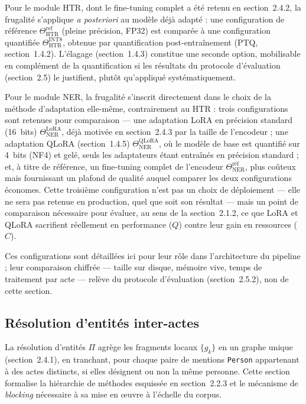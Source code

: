 Pour le module HTR, dont le fine-tuning complet a été retenu en section~2.4.2, la frugalité s'applique \emph{a posteriori} au modèle déjà adapté : une configuration de référence $\Theta_{\mathrm{HTR}}^{\mathrm{ref}}$ (pleine précision, FP32) est comparée à une configuration quantifiée $\Theta_{\mathrm{HTR}}^{\mathrm{INT8}}$, obtenue par quantification post-entraînement (PTQ, section~1.4.2).
L'élagage (section~1.4.3) constitue une seconde option, mobilisable en complément de la quantification si les résultats du protocole d'évaluation (section~2.5) le justifient, plutôt qu'appliqué systématiquement.

Pour le module NER, la frugalité s'inscrit directement dans le choix de la méthode d'adaptation elle-même, contrairement au HTR : trois configurations sont retenues pour comparaison --- une adaptation LoRA en précision standard (16~bits) $\Theta_{\mathrm{NER}}^{\mathrm{LoRA}}$, déjà motivée en section~2.4.3 par la taille de l'encodeur ; une adaptation QLoRA (section~1.4.5) $\Theta_{\mathrm{NER}}^{\mathrm{QLoRA}}$, où le modèle de base est quantifié sur 4~bits (NF4) et gelé, seuls les adaptateurs étant entraînés en précision standard ; et, à titre de référence, un fine-tuning complet de l'encodeur $\Theta_{\mathrm{NER}}^{\mathrm{\text{réf}}}$, plus coûteux mais fournissant un plafond de qualité auquel comparer les deux configurations économes.
Cette troisième configuration n'est pas un choix de déploiement --- elle ne sera pas retenue en production, quel que soit son résultat --- mais un point de comparaison nécessaire pour évaluer, au sens de la section~2.1.2, ce que LoRA et QLoRA sacrifient réellement en performance ($Q$) contre leur gain en ressources ($C$).

Ces configurations sont détaillées ici pour leur rôle dans l'architecture du pipeline ; leur comparaison chiffrée --- taille sur disque, mémoire vive, temps de traitement par acte --- relève du protocole d'évaluation (section~2.5.2), non de cette section.

\subsection{Résolution d'entités inter-actes}

La résolution d'entités $\Pi$ agrège les fragments locaux $\{g_k\}$ en un graphe unique (section~2.4.1), en tranchant, pour chaque paire de mentions \texttt{Person} appartenant à des actes distincts, si elles désignent ou non la même personne.
Cette section formalise la hiérarchie de méthodes esquissée en section~2.2.3 et le mécanisme de \textit{blocking} nécessaire à sa mise en œuvre à l'échelle du corpus.

